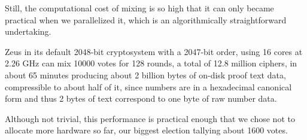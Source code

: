 \documentclass[letterpaper,10pt]{article}
\begin{document}
Still, the computational cost of mixing is so high that
it can only became practical when we parallelized it,
which is an algorithmically straightforward undertaking.

Zeus in its default 2048-bit cryptosystem with a 2047-bit order,
using 16 cores at 2.26 GHz can mix 10000 votes for 128 rounds,
a total of 12.8 million ciphers, in about 65 minutes
producing about 2 billion bytes of on-disk proof text data,
compressible to about half of it,
since numbers are in a hexadecimal canonical form and thus
2 bytes of text correspond to one byte of raw number data.

Although not trivial, this performance is practical enough that
we chose not to allocate more hardware so far,
our biggest election tallying about 1600 votes.

% 
% 

\end{document}
